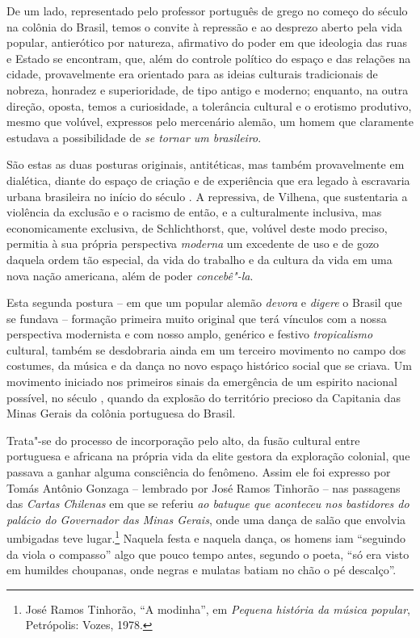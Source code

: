 De um lado, representado pelo professor português de grego no começo do
século  na colônia do Brasil, temos o convite à repressão e ao
desprezo aberto pela vida popular, antierótico por natureza, afirmativo
do poder em que ideologia das ruas e Estado se encontram, que, além do
controle político do espaço e das relações na cidade, provavelmente era
orientado para as ideias culturais tradicionais de nobreza, honradez e
superioridade, de tipo antigo e moderno; enquanto, na outra direção,
oposta, temos a curiosidade, a tolerância cultural e o erotismo
produtivo, mesmo que volúvel, expressos pelo mercenário alemão, um homem
que claramente estudava a possibilidade de \emph{se tornar um
brasileiro}.

São estas as duas posturas originais, antitéticas, mas também
provavelmente em dialética, diante do espaço de criação e de experiência
que era legado à escravaria urbana brasileira no início do século . A
repressiva, de Vilhena, que sustentaria a violência da exclusão e o
racismo de então, e a culturalmente inclusiva, mas economicamente
exclusiva, de Schlichthorst, que, volúvel deste modo preciso, permitia à
sua própria perspectiva \emph{moderna} um excedente de uso e de gozo
daquela ordem tão especial, da vida do trabalho e da cultura da vida em
uma nova nação americana, além de poder \emph{concebê"-la}.

Esta segunda postura -- em que um popular alemão \emph{devora} e
\emph{digere} o Brasil que se fundava -- formação primeira muito
original que terá vínculos com a nossa perspectiva modernista e com
nosso amplo, genérico e festivo \emph{tropicalismo} cultural, também se
desdobraria ainda em um terceiro movimento no campo dos costumes, da
música e da dança no novo espaço histórico social que se criava. Um
movimento iniciado nos primeiros sinais da emergência de um espirito
nacional possível, no século , quando da explosão do território
precioso da Capitania das Minas Gerais da colônia portuguesa do Brasil.

Trata"-se do processo de incorporação pelo alto, da fusão cultural entre
portuguesa e africana na própria vida da elite gestora da exploração
colonial, que passava a ganhar alguma consciência do fenômeno. Assim ele
foi expresso por Tomás Antônio Gonzaga -- lembrado por José Ramos
Tinhorão -- nas passagens das \emph{Cartas} \emph{Chilenas} em que se
referiu \emph{ao batuque que aconteceu nos bastidores do palácio do
Governador das Minas Gerais}, onde uma dança de salão que envolvia
umbigadas teve lugar.\footnote{José Ramos Tinhorão, ``A modinha'', em
  \emph{Pequena história da música popular}, Petrópolis: Vozes, 1978.}
Naquela festa e naquela dança, os homens iam ``seguindo da viola o
compasso'' algo que pouco tempo antes, segundo o poeta, ``só era visto
em humildes choupanas, onde negras e mulatas batiam no chão o pé
descalço''.

